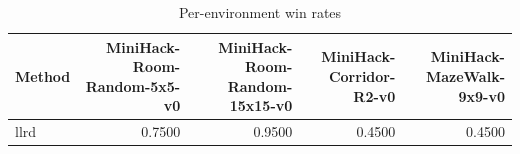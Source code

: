\begin{table}[htbp]
\centering
\caption{Per-environment win rates}
\label{tab:per-env}
\begin{tabular}{lrrrr}
\toprule
\textbf{Method} & \textbf{MiniHack-Room-Random-5x5-v0} & \textbf{MiniHack-Room-Random-15x15-v0} & \textbf{MiniHack-Corridor-R2-v0} & \textbf{MiniHack-MazeWalk-9x9-v0} \\
\midrule
llrd & 0.7500 & 0.9500 & 0.4500 & 0.4500 \\
\bottomrule
\end{tabular}
\end{table}